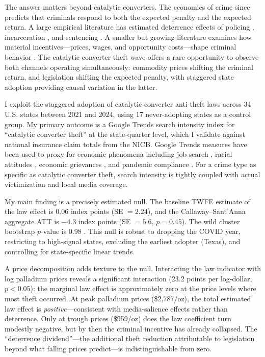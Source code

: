 \documentclass[12pt]{article}
\begin{document}
The answer matters beyond catalytic converters. The economics of crime since \citet{becker1968crime} predicts that criminals respond to both the expected penalty and the expected return. A large empirical literature has estimated deterrence effects of policing \citep{levitt1997using, chalfin2018effect}, incarceration \citep{levitt2004understanding, durlauf2011imprisonment}, and sentencing \citep{drago2009political, lee2009crime}. A smaller but growing literature examines how material incentives---prices, wages, and opportunity costs---shape criminal behavior \citep{ehrlich1973participation, draca2019changing, mastrobuoni2011optimal}. The catalytic converter theft wave offers a rare opportunity to observe both channels operating simultaneously: commodity prices shifting the criminal return, and legislation shifting the expected penalty, with staggered state adoption providing causal variation in the latter.

I exploit the staggered adoption of catalytic converter anti-theft laws across 34 U.S. states between 2021 and 2024, using 17 never-adopting states as a control group. My primary outcome is a Google Trends search intensity index for ``catalytic converter theft'' at the state-quarter level, which I validate against national insurance claim totals from the NICB. Google Trends measures have been used to proxy for economic phenomena including job search \citep{baker2017job}, racial attitudes \citep{stephens2014cost}, economic grievances \citep{fetzer2019did}, and pandemic compliance \citep{brodeur2021stay}. For a crime type as specific as catalytic converter theft, search intensity is tightly coupled with actual victimization and local media coverage.

My main finding is a precisely estimated null. The baseline TWFE estimate of the law effect is 0.06 index points (SE $= 2.24$), and the Callaway--Sant'Anna \citeyearpar{callaway2021difference} aggregate ATT is $-4.3$ index points (SE $= 5.6$, $p = 0.45$). The wild cluster bootstrap $p$-value is 0.98 \citep{cameron2008bootstrap}. This null is robust to dropping the COVID year, restricting to high-signal states, excluding the earliest adopter (Texas), and controlling for state-specific linear trends.

A price decomposition adds texture to the null. Interacting the law indicator with log palladium prices reveals a significant interaction (23.2 points per log-dollar, $p < 0.05$): the marginal law effect is approximately zero at the price levels where most theft occurred. At peak palladium prices (\$2,787/oz), the total estimated law effect is \textit{positive}---consistent with media-salience effects rather than deterrence. Only at trough prices (\$959/oz) does the law coefficient turn modestly negative, but by then the criminal incentive has already collapsed. The ``deterrence dividend''---the additional theft reduction attributable to legislation beyond what falling prices predict---is indistinguishable from zero.
\end{document}
